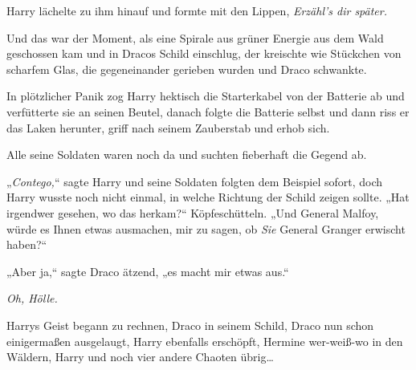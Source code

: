 Harry lächelte zu ihm hinauf und formte mit den Lippen, \emph{Erzähl's dir später.}

Und das war der Moment, als eine Spirale aus grüner Energie aus dem Wald geschossen kam und in Dracos Schild einschlug, der kreischte wie Stückchen von scharfem Glas, die gegeneinander gerieben wurden und Draco schwankte.

In plötzlicher Panik zog Harry hektisch die Starterkabel von der Batterie ab und verfütterte sie an seinen Beutel, danach folgte die Batterie selbst und dann riss er das Laken herunter, griff nach seinem Zauberstab und erhob sich.

Alle seine Soldaten waren noch da und suchten fieberhaft die Gegend ab.

„\emph{Contego,}“ sagte Harry und seine Soldaten folgten dem Beispiel sofort, doch Harry wusste noch nicht einmal, in welche Richtung der Schild zeigen sollte. „Hat irgendwer gesehen, wo das herkam?“ Köpfeschütteln. „Und General Malfoy, würde es Ihnen etwas ausmachen, mir zu sagen, ob \emph{Sie} General Granger erwischt haben?“

„Aber ja,“ sagte Draco ätzend, „es macht mir etwas aus.“

\emph{Oh, Hölle.}

Harrys Geist begann zu rechnen, Draco in seinem Schild, Draco nun schon einigermaßen ausgelaugt, Harry ebenfalls erschöpft, Hermine wer-weiß-wo in den Wäldern, Harry und noch vier andere Chaoten übrig…

